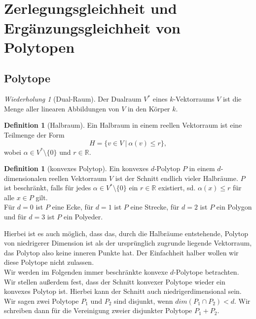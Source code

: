 \documentclass[11pt,titlepage]{article}
\newcommand{\setR}{\mathbb{R}}
\theoremstyle{definition}
\newtheorem{definition}[theorem]{Definition}
\theoremstyle{remark}
\newtheorem*{repetition}{Wiederholung}
\begin{document}
	\newpage \ 
	\thispagestyle{empty}
	\newpage
	\thispagestyle{empty}
	
	\tableofcontents
	
	
	\newpage \
	\thispagestyle{empty} 
	\newpage
	\setcounter{page}{1}
	
	\section{Zerlegungsgleichheit und Ergänzungsgleichheit von Polytopen}
	
	\subsection{Polytope}
	
	\begin{repetition}[Dual-Raum]
		Der Dualraum $V^*$ eines $k$-Vektorraums $V$ ist die Menge aller linearen Abbildungen von $V$ in den Körper 	$k$.
	\end{repetition}
	
	\begin{definition}[Halbraum]
		Ein Halbraum in einem reellen Vektorraum ist eine Teilmenge der Form
		\[ H= \{ v\in V \  \vert\  \alpha(v)\leq r \}, \]
		wobei $\alpha\in V^*\setminus\{0\}$ und $r\in\setR$.
	\end{definition}
	
	\begin{definition}[konvexes Polytop]
		Ein konvexes $d$-Polytop $P$ in einem $d$-dimensionalen reellen Vektorraum $V$ ist der Schnitt endlich vieler 
		Halbräume. $P$ ist beschränkt, falls für jedes $\alpha\in V^*\setminus\{0\}$ ein $r\in \setR$ existiert, sd. 
		$\alpha(x)\leq r$ für alle $x\in P$ gilt. \\
		Für $d=0$ ist $P$ eine Ecke, für $d=1$ ist $P$ eine Strecke, für $d=2$ ist $P$ ein Polygon und für $d=3$ 
		ist $P$ ein Polyeder.
	\end{definition}
	
	Hierbei ist es auch möglich, dass das, durch die Halbräume entstehende, Polytop 
	von niedrigerer Dimension ist als der ursprünglich zugrunde liegende 
	Vektorraum, das Polytop also keine inneren Punkte hat. Der Einfachheit halber 
	wollen wir diese Polytope nicht zulassen. \\
	Wir werden im Folgenden immer beschränkte konvexe $d$-Polytope betrachten. Wir stellen außerdem fest, dass 
	der Schnitt konvexer Polytope wieder ein konvexes Polytop ist. Hierbei kann der Schnitt auch niedrigerdimensional 
	sein. Wir sagen zwei Polytope $P_1$ und $P_2$ sind disjunkt, wenn $dim(P_1\cap P_2)<d$. Wir schreiben dann 
	für die Vereinigung zweier disjunkter Polytope $P_1+P_2$.
	
\end{document}
